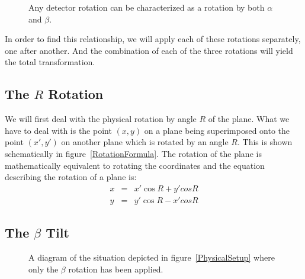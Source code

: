 \begin{figure}
\centering
{}
\caption{Any detector rotation can be characterized 
as a rotation by both $\alpha$ and $\beta$.}
\label{ThreeTilts}
\end{figure}

In order to find this relationship, we will apply each of these 
rotations separately, one after another. And the combination 
of each of the three rotations will yield the total 
transformation.


\subsection{The $R$ Rotation}

\begin{SCfigure}
\centering

\caption{This figure shows how points on a detector rotated 
by angle $R$ relate to the unrotated points. Remember that
a rotation of the plane is equivalent to the rotation of the
coordinates on the plane (which is what I have drawn).}
\label{RotationFormula}
\end{SCfigure}

We will first deal with the physical rotation by angle $R$ 
of the plane. What we have to deal with is the point $(x,y)$
on a plane being superimposed onto the point $(x',y')$ on 
another plane which is rotated by an angle $R$. This is shown
schematically in figure~\ref{RotationFormula}. The rotation of
the plane is mathematically equivalent to rotating the coordinates
and the equation describing the rotation of a plane is:
\begin{eqnarray}
    x&=&x'\cos R + y'cos R\\
    y&=&y'\cos R - x'cos R
\end{eqnarray}

\subsection{The $\beta$ Tilt}

\begin{figure}
\centering
\subfloat[]{\label{PitchX_A}} 
\hfill
\subfloat[]{
\label{PitchX_B}}
\caption{A diagram of the situation depicted in 
figure~\ref{PhysicalSetup} where only the 
$\beta$ rotation has been applied.}
\label{PitchX}
\end{figure}

